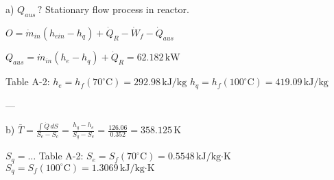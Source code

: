 a) \( Q_{aus} \, ? \)  
Stationary flow process in reactor.  

\( O = \dot{m}_{in} (h_{ein} - h_{q}) + \dot{Q}_R - \dot{W}_f - \dot{Q}_{aus} \)  

\( Q_{aus} = \dot{m}_{in} (h_{e} - h_{q}) + \dot{Q}_R = 62.182 \, \text{kW} \)  

Table A-2:  
\( h_e = h_f (70^\circ \text{C}) = 292.98 \, \text{kJ/kg} \)  
\( h_q = h_f (100^\circ \text{C}) = 419.09 \, \text{kJ/kg} \)  

---

b)  
\( \bar{T} = \frac{\int \dot{Q} \, dS}{S_{e} - S_{c}} = \frac{h_q - h_e}{S_{q} - S_{e}} = \frac{126.06}{0.352} = 358.125 \, \text{K} \)  

\( S_{q} = \dots \)  
Table A-2:  
\( S_e = S_f (70^\circ \text{C}) = 0.5548 \, \text{kJ/kg·K} \)  
\( S_q = S_f (100^\circ \text{C}) = 1.3069 \, \text{kJ/kg·K} \)
